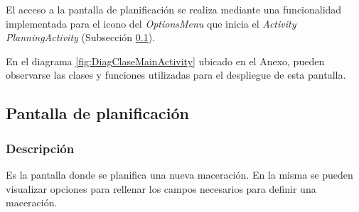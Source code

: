                 \par El acceso a la pantalla de planificación se realiza mediante una funcionalidad implementada para el icono del \textit{OptionsMenu} que inicia el \textit{Activity PlanningActivity} (Subsección \ref{DescripPantallaPlanificación}).
                
                \par En el diagrama \ref{fig:DiagClaseMainActivity} ubicado en el Anexo, pueden observarse las clases y funciones utilizadas para el despliegue de esta pantalla.
                
                
                
        \subsection{Pantalla de planificación}
        \label{DescripPantallaPlanificación}
        \subsubsection{Descripción}
                \par Es la pantalla donde se planifica una nueva maceración. En la misma se pueden visualizar opciones para rellenar los campos necesarios para definir una maceración.
                
